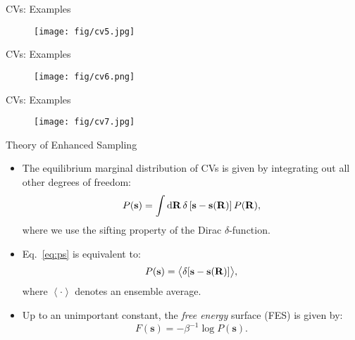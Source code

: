 \documentclass[10pt]{beamer}
\begin{document}
\begin{frame}{CVs: Examples}
  \begin{figure}
    \texttt{[image: fig/cv5.jpg]}
  \end{figure}
\end{frame}

\begin{frame}{CVs: Examples}
  \begin{figure}
    \texttt{[image: fig/cv6.png]}
  \end{figure}
\end{frame}

\begin{frame}{CVs: Examples}
  \begin{figure}
    \texttt{[image: fig/cv7.jpg]}
  \end{figure}
\end{frame}

\begin{frame}{Theory of Enhanced Sampling}
\begin{itemize}
\setlength\itemsep{1em}
  \item The equilibrium marginal distribution of CVs is given by integrating out all other degrees of freedom:
  \begin{align}
  \label{eq:ps}
    P(\mathbf{s}) =
      \int \mathrm{d}\mathbf{R} \, \delta
        \left[
          \mathbf{s} - \mathbf{s}(\mathbf{R})
        \right]
      P(\mathbf{R}),
  \end{align}
  where we use the sifting property of the Dirac $\delta$-function.

  \item Eq.~\ref{eq:ps} is equivalent to:
  \begin{equation}
    P({\bf s}) = \big< \delta[\mathbf{s}-\mathbf{s(R)}] \big>,
  \end{equation}
  where $\left<\cdot\right>$ denotes an ensemble average.

  \item Up to an unimportant constant, the \textit{free energy} surface (FES) is given by:
  \begin{equation}
    F(\mathbf{s})= -\beta^{-1} \log P(\mathbf{s}).
  \end{equation}
\end{itemize}
\end{frame}
\end{document}
